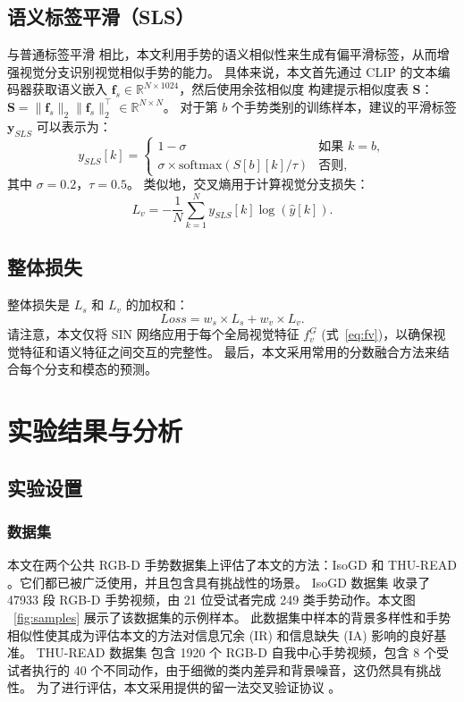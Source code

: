 \subsection{语义标签平滑（SLS）}
与普通标签平滑 \cite{he2019bag} 相比，本文利用手势的语义相似性来生成有偏平滑标签，从而增强视觉分支识别视觉相似手势的能力。
具体来说，本文首先通过 CLIP 的文本编码器获取语义嵌入 $\mathbf{f}_{s} \in \mathbb{R}^{N\times 1024}$，然后使用余弦相似度 \cite{zuo2023natural} 构建提示相似度表 $\mathbf{S}$：$\mathbf{S} = \|\mathbf{f}_{s}\|_2\|\mathbf{f}_{s}\|_2^{\top} \in \mathbb{R}^{N\times N}$。
%
对于第 $b$ 个手势类别的训练样本，建议的平滑标签 $\mathbf{y}_{SLS}$ 可以表示为：
\begin{equation}
y_{SLS}[k] = \begin{cases}
1 - \sigma & \text{如果 } k = b,\\
\sigma \times \text{softmax}\left(S[b][k]/\tau\right) & \text{否则},
\end{cases}
\end{equation}
其中 $\sigma=0.2$，$\tau=0.5$。
类似地，交叉熵用于计算视觉分支损失：
\begin{equation}
L_{v} = -\frac{1}{N}\sum_{k=1}^{N}{y_{SLS}[k]\log\left(\hat{y}[k]\right)}. %
\end{equation}

\subsection{整体损失}
整体损失是 $L_{s}$ 和 $L_{v}$ 的加权和：
\begin{equation}
Loss = w_{s} \times L_{s} + w_{v} \times L_{v}.
\label{eq:overall_loss}
\end{equation}
%
请注意，本文仅将 SIN 网络应用于每个全局视觉特征 $f_v^G$ (式~\eqref{eq:fv})，以确保视觉特征和语义特征之间交互的完整性。
最后，本文采用常用的分数融合方法来结合每个分支和模态的预测。

\section{实验结果与分析}
\label{sec:GR_EXP}
\subsection{实验设置}
\subsubsection{数据集}
本文在两个公共 RGB-D 手势数据集上评估了本文的方法：IsoGD \cite{wan2016chalearn} 和 THU-READ \cite{tang2017action}。它们都已被广泛使用，并且包含具有挑战性的场景。
IsoGD 数据集 \cite{wan2016chalearn} 收录了 47933 段 RGB-D 手势视频，由 21 位受试者完成 249 类手势动作。本文图 ~\ref{fig:samples} 展示了该数据集的示例样本。
此数据集中样本的背景多样性和手势相似性使其成为评估本文的方法对信息冗余 (IR) 和信息缺失 (IA) 影响的良好基准。
THU-READ 数据集 \cite{tang2017action} 包含 1920 个 RGB-D 自我中心手势视频，包含 8 个受试者执行的 40 个不同动作，由于细微的类内差异和背景噪音，这仍然具有挑战性。
为了进行评估，本文采用提供的留一法交叉验证协议 \cite{li2021trear}。

